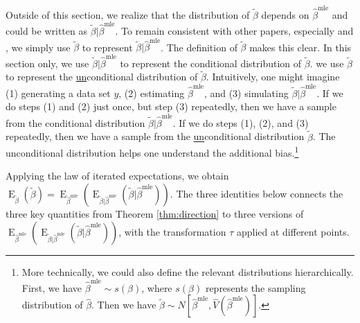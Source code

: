 \documentclass[10pt]{article}
\DeclareMathOperator*{\E}{\text{E}}
\begin{document}
Outside of this section, we realize that the distribution of $\tilde{\beta}$ depends on $\hat{\beta}^\text{mle}$ and could be written as $\tilde{\beta} | \hat{\beta}^\text{mle}$. 
To remain consistent with other papers, especially \cite{KingTomzWittenberg2000} and \cite{Herron1999}, we simply use $\tilde{\beta}$ to represent $\tilde{\beta} | \hat{\beta}^\text{mle}$.
The definition of $\tilde{\beta}$ makes this clear. 
In this section only, we use $\tilde{\beta} | \hat{\beta}^\text{mle}$ to represent the conditional distribution of $\tilde{\beta}$. 
we use $\tilde{\beta}$ to represent the \underline{un}conditional distribution of $\tilde{\beta}$.
Intuitively, one might imagine (1) generating a data set $y$, (2) estimating $\hat{\beta}^\text{mle}$, and (3) simulating $\tilde{\beta} | \hat{\beta}^\text{mle}$. 
If we do steps (1) and (2) just once, but step (3) repeatedly, then we have a sample from the conditional distribution $\tilde{\beta} | \hat{\beta}^\text{mle}$. 
If we do steps (1), (2), and (3) repeatedly, then we have a sample from the \underline{un}conditional distribution $\tilde{\beta}$. 
The unconditional distribution helps one understand the additional bias.\footnote{More technically, we could also define the relevant distributions hierarchically. First, we have $\hat{\beta}^\text{mle} \sim s(\beta)$, where $s(\beta)$ represents the sampling distribution of $\hat{\beta}$. Then we have $\tilde{\beta} \sim N \left[ \hat{\beta}^{\text{mle}}, \hat{V} \left( \hat{\beta}^{\text{mle}} \right) \right]$.}

Applying the law of iterated expectations, we obtain $\E_{\tilde{\beta}} \left( \tilde{\beta} \right) = \E_{\hat{\beta}^\text{mle}}\left( \E_{\tilde{\beta} | \hat{\beta}^\text{mle}} (\tilde{\beta} | \hat{\beta}^\text{mle}) \right)$.
The three identities below connects the three key quantities from Theorem \ref{thm:direction} to three versions of $\E_{\hat{\beta}^\text{mle}}\left( \E_{\tilde{\beta} | \hat{\beta}^\text{mle}} (\tilde{\beta} | \hat{\beta}^\text{mle}) \right)$, with the transformation $\tau$ applied at different points.
\end{document}
